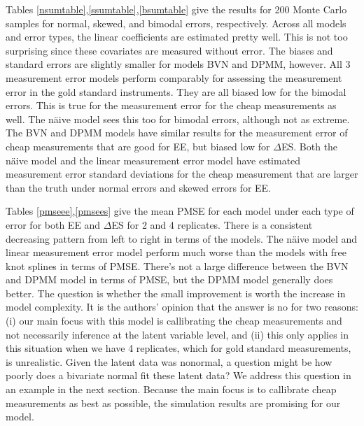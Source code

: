 \documentclass[11pt]{article}\usepackage[]{graphicx}\usepackage[]{color}
\begin{document}
Tables \ref{nsumtable},\ref{ssumtable},\ref{bsumtable} give the results for 200 Monte Carlo samples for normal, skewed, and bimodal errors, respectively. Across all models and error types, the linear coefficients are estimated pretty well. This is not too surprising since these covariates are measured without error. The biases and standard errors are slightly smaller for models BVN and DPMM, however. All 3 measurement error models perform comparably for assessing the measurement error in the gold standard instruments. They are all biased low for the bimodal errors. This is true for the measurement error for the cheap measurements as well. The n{\"a}ive model sees this too for bimodal errors, although not as extreme. The BVN and DPMM models have similar results for the measurement error of cheap measurements that are good for EE, but biased low for $\Delta$ES. Both the n{\"a}ive model and the linear measurement error model have estimated measurement error standard deviations for the cheap measurement that are larger than the truth under normal errors and skewed errors for EE. 

Tables \ref{pmseee},\ref{pmsees} give the mean PMSE for each model under each type of error for both EE and $\Delta$ES for 2 and 4 replicates. There is a consistent decreasing pattern from left to right in terms of the models. The n{\"a}ive model and linear measurement error model perform much worse than the models with free knot splines in terms of PMSE. There's not a large difference between the BVN and DPMM model in terms of PMSE, but the DPMM model generally does better. The question is whether the small improvement is worth the increase in model complexity. It is the authors' opinion that the answer is no for two reasons: (i) our main focus with this model is callibrating the cheap measurements and not necessarily inference at the latent variable level, and (ii) this only applies in this situation when we have 4 replicates, which for gold standard measurements, is unrealistic. Given the latent data was nonormal, a question might be how poorly does a bivariate normal fit these latent data? We address this question in an example in the next section. Because the main focus is to callibrate cheap measurements as best as possible, the simulation results are promising for our model.


\clearpage
{} %
\thispagestyle{empty}
\end{document}
